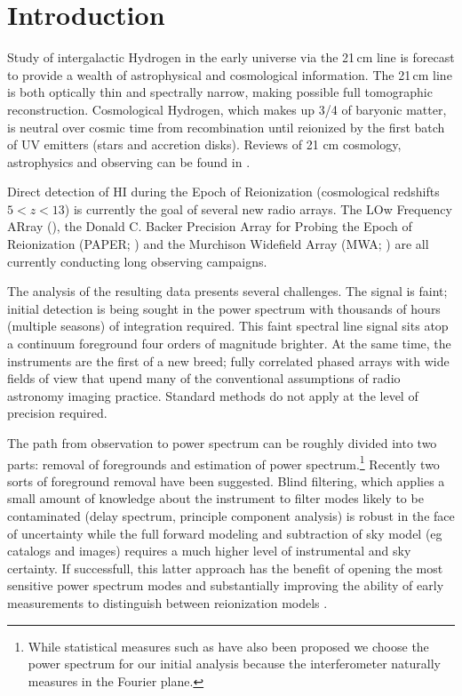 \section{Introduction} 
  Study of intergalactic Hydrogen  in the early universe via the 21\,cm line is forecast to provide a wealth of astrophysical and cosmological information.  The 21\,cm line is both optically thin and spectrally narrow, making possible full tomographic reconstruction. Cosmological Hydrogen, which makes up 3/4 of baryonic matter, is neutral over cosmic time from recombination until reionized by the first batch of UV emitters (stars and accretion disks).  Reviews of 21 cm cosmology, astrophysics and observing can be found in \cite{Morales:2010p8093,Furlanetto:2006p2267,Pritchard:2012p9555,zaroubi2013epoch}.
  
Direct detection of HI during the Epoch of Reionization (cosmological redshifts $5<z<13$) is currently the goal of several new radio arrays. The LOw Frequency ARray (), the Donald C. Backer Precision Array for Probing the Epoch of Reionization (PAPER; ) and the Murchison Widefield Array (MWA; ) are all currently conducting long observing campaigns.

The analysis of the resulting data presents several challenges. The signal is faint; initial detection is being sought in the power spectrum with thousands of hours (multiple seasons) of integration required. This faint spectral line signal sits atop a continuum foreground four orders of magnitude brighter. At the same time, the instruments are the first of a new breed; fully correlated phased arrays with wide fields of view that upend many of the conventional assumptions of radio astronomy imaging practice. Standard methods do not apply at the level of precision required. 

The path from observation to power spectrum can be roughly divided into two parts: removal of foregrounds and estimation of power spectrum.\footnote{While statistical measures  such as \citet{Barkana:2008p2154} have also been proposed we choose the power spectrum for our initial analysis because the interferometer naturally measures in the Fourier plane.} Recently two sorts of foreground removal have been suggested. Blind filtering, which applies a small amount of knowledge about the instrument to filter modes likely to be contaminated (delay spectrum, principle component analysis) is robust in the face of uncertainty while the full forward modeling and subtraction of sky model (eg catalogs and images) requires a much higher level of instrumental and sky certainty. If successfull, this latter approach has the benefit of opening the most sensitive power spectrum modes and substantially improving the ability of early measurements to distinguish between reionization models \citep{Pober:2014p10390}.

